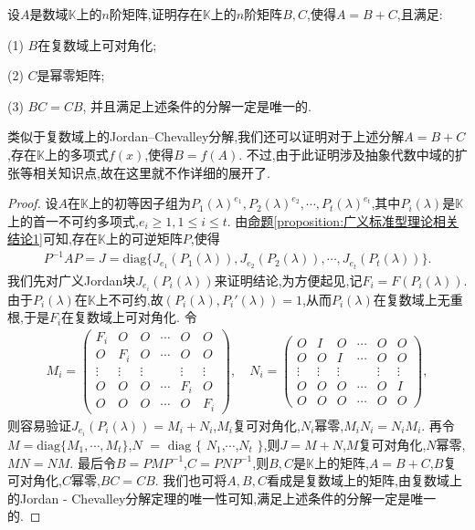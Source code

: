 \documentclass[../../main.tex]{subfiles}
\begin{document}
\begin{theorem}\label{theorem:数K上的Jordan-Chevalley分解}
设$A$是数域$\mathbb{K}$上的$n$阶矩阵,证明存在$\mathbb{K}$上的$n$阶矩阵$B,C$,使得$A = B + C$,且满足:

(1) $B$在复数域上可对角化; 

(2) $C$是幂零矩阵; 

(3) $BC = CB$,
并且满足上述条件的分解一定是唯一的.
\end{theorem}
\begin{remark}
类似于复数域上的Jordan--Chevalley分解,我们还可以证明对于上述分解$A = B + C$,存在$\mathbb{K}$上的多项式$f(x)$,使得$B = f(A)$. 不过,由于此证明涉及抽象代数中域的扩张等相关知识点,故在这里就不作详细的展开了. 
\end{remark}
\begin{proof}
设$A$在$\mathbb{K}$上的初等因子组为$P_1(\lambda)^{e_1},P_2(\lambda)^{e_2},\cdots,P_t(\lambda)^{e_t}$,其中$P_i(\lambda)$是$\mathbb{K}$上的首一不可约多项式,$e_i\geqslant 1, 1\leqslant i\leqslant t$. 由\hyperref[proposition:广义标准型理论相关结论1]{命题\ref{proposition:广义标准型理论相关结论1}}可知,存在$\mathbb{K}$上的可逆矩阵$P$,使得
\begin{align*}
P^{-1}AP = J=\mathrm{diag}\{J_{e_1}(P_1(\lambda)),J_{e_2}(P_2(\lambda)),\cdots,J_{e_t}(P_t(\lambda))\}.
\end{align*}
我们先对广义Jordan块$J_{e_i}(P_i(\lambda))$来证明结论,为方便起见,记$F_i = F(P_i(\lambda))$. 由于$P_i(\lambda)$在$\mathbb{K}$上不可约,故$(P_i(\lambda),P_i'(\lambda)) = 1$,从而$P_i(\lambda)$在复数域上无重根,于是$F_i$在复数域上可对角化. 令
\begin{align*}
M_i = 
\begin{pmatrix}
F_i & O & O & \cdots & O & O \\
O & F_i & O & \cdots & O & O \\
\vdots & \vdots & \vdots & & \vdots & \vdots \\
O & O & O & \cdots & F_i & O \\
O & O & O & \cdots & O & F_i
\end{pmatrix}, \quad 
N_i = 
\begin{pmatrix}
O & I & O & \cdots & O & O \\
O & O & I & \cdots & O & O \\
\vdots & \vdots & \vdots & & \vdots & \vdots \\
O & O & O & \cdots & O & I \\
O & O & O & \cdots & O & O
\end{pmatrix},
\end{align*}
则容易验证$J_{e_i}(P_i(\lambda)) = M_i + N_i$,$M_i$复可对角化,$N_i$幂零,$M_iN_i = N_iM_i$. 再令$M = \mathrm{diag}\{M_1,\cdots,M_t\}$,$N $ $=$ $\mathrm{diag}$ $\{$ $N_1$,$\cdots$,$N_t$ $\}$,则$J = M + N$,$M$复可对角化,$N$幂零,$MN = NM$. 最后令$B = PMP^{-1}$,$C = PNP^{-1}$,则$B,C$是$\mathbb{K}$上的矩阵,$A = B + C$,$B$复可对角化,$C$幂零,$BC = CB$. 我们也可将$A,B,C$看成是复数域上的矩阵,由复数域上的Jordan - Chevalley分解定理的唯一性可知,满足上述条件的分解一定是唯一的. 

\end{proof}
\end{document}
